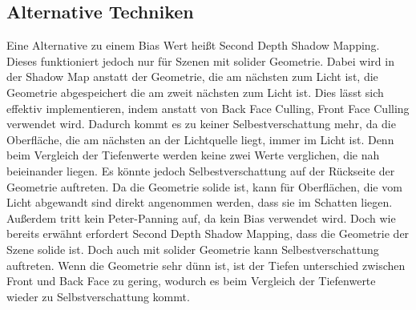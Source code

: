 \subsection{Alternative Techniken}
\label{section:sdsm}
Eine Alternative zu einem Bias Wert heißt Second Depth Shadow Mapping.
Dieses funktioniert jedoch nur für Szenen mit solider Geometrie.
Dabei wird in der Shadow Map anstatt der Geometrie, die am nächsten zum 
Licht ist, die Geometrie abgespeichert die am zweit nächsten zum Licht ist.
Dies lässt sich effektiv implementieren, indem anstatt von Back Face Culling, Front Face Culling verwendet wird.
Dadurch kommt es zu keiner Selbestverschattung mehr, da die Oberfläche, die am nächsten an der 
Lichtquelle liegt, immer im Licht ist. 
Denn beim Vergleich der Tiefenwerte werden keine zwei Werte verglichen, die nah beieinander liegen.
Es könnte jedoch Selbestverschattung auf der Rückseite der Geometrie auftreten.
Da die Geometrie solide ist, kann für Oberflächen, die vom Licht abgewandt sind direkt 
angenommen werden, dass sie im Schatten liegen.
Außerdem tritt kein Peter-Panning auf, da kein Bias verwendet wird.
Doch wie bereits erwähnt erfordert Second Depth Shadow Mapping, dass die
Geometrie der Szene solide ist.
Doch auch mit solider Geometrie kann Selbestverschattung auftreten.
Wenn die Geometrie sehr dünn ist, ist der Tiefen unterschied zwischen Front und Back Face zu gering, 
wodurch es beim Vergleich der Tiefenwerte wieder zu Selbstverschattung kommt.

